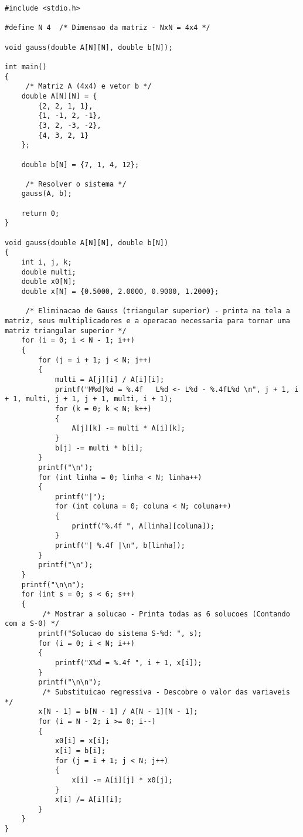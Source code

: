 \documentclass[12pt]{article}
\begin{document}
            \begin{verbatim}
#include <stdio.h>

#define N 4  /* Dimensao da matriz - NxN = 4x4 */

void gauss(double A[N][N], double b[N]);

int main()
{
     /* Matriz A (4x4) e vetor b */
    double A[N][N] = {
        {2, 2, 1, 1},
        {1, -1, 2, -1},
        {3, 2, -3, -2},
        {4, 3, 2, 1}
    };

    double b[N] = {7, 1, 4, 12};

     /* Resolver o sistema */
    gauss(A, b);

    return 0;
}

void gauss(double A[N][N], double b[N])
{
    int i, j, k;
    double multi;
    double x0[N];
    double x[N] = {0.5000, 2.0000, 0.9000, 1.2000};

     /* Eliminacao de Gauss (triangular superior) - printa na tela a matriz, seus multiplicadores e a operacao necessaria para tornar uma matriz triangular superior */
    for (i = 0; i < N - 1; i++)
    {
        for (j = i + 1; j < N; j++)
        {
            multi = A[j][i] / A[i][i];
            printf("M%d|%d = %.4f   L%d <- L%d - %.4fL%d \n", j + 1, i + 1, multi, j + 1, j + 1, multi, i + 1);
            for (k = 0; k < N; k++)
            {
                A[j][k] -= multi * A[i][k];
            }
            b[j] -= multi * b[i];
        }
        printf("\n");
        for (int linha = 0; linha < N; linha++)
        {
            printf("|");
            for (int coluna = 0; coluna < N; coluna++)
            {
                printf("%.4f ", A[linha][coluna]);
            }
            printf("| %.4f |\n", b[linha]);
        }
        printf("\n");
    }
    printf("\n\n");
    for (int s = 0; s < 6; s++)
    {
         /* Mostrar a solucao - Printa todas as 6 solucoes (Contando com a S-0) */
        printf("Solucao do sistema S-%d: ", s);
        for (i = 0; i < N; i++)
        {
            printf("X%d = %.4f ", i + 1, x[i]);
        }
        printf("\n\n");
         /* Substituicao regressiva - Descobre o valor das variaveis */
        x[N - 1] = b[N - 1] / A[N - 1][N - 1];
        for (i = N - 2; i >= 0; i--)
        {
            x0[i] = x[i];
            x[i] = b[i];
            for (j = i + 1; j < N; j++)
            {
                x[i] -= A[i][j] * x0[j];
            }
            x[i] /= A[i][i];
        }
    }
}
            \end{verbatim}
\end{document}
